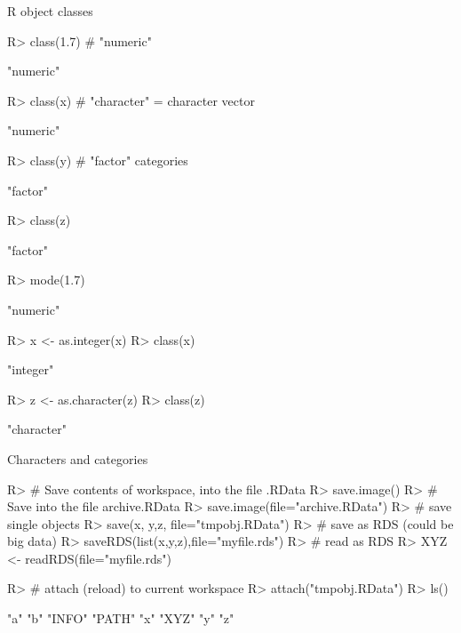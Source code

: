 \documentclass[10pt]{beamer}
\let\proglang=\textsf
\begin{document}
\begin{frame}[fragile]{\proglang{R} object classes}
\begin{Schunk}
\begin{Sinput}
R> class(1.7) # "numeric"
\end{Sinput}
\begin{Soutput}
[1] "numeric"
\end{Soutput}
\begin{Sinput}
R> class(x)   # "character" = character vector
\end{Sinput}
\begin{Soutput}
[1] "numeric"
\end{Soutput}
\begin{Sinput}
R> class(y)   # "factor" categories
\end{Sinput}
\begin{Soutput}
[1] "factor"
\end{Soutput}
\begin{Sinput}
R> class(z)
\end{Sinput}
\begin{Soutput}
[1] "factor"
\end{Soutput}
\begin{Sinput}
R> mode(1.7)
\end{Sinput}
\begin{Soutput}
[1] "numeric"
\end{Soutput}
\begin{Sinput}
R> x <- as.integer(x)
R> class(x)
\end{Sinput}
\begin{Soutput}
[1] "integer"
\end{Soutput}
\begin{Sinput}
R> z <- as.character(z)
R> class(z)
\end{Sinput}
\begin{Soutput}
[1] "character"
\end{Soutput}
\end{Schunk}
\end{frame}
%
\begin{frame}[fragile]{Characters and categories}
\begin{Schunk}
\begin{Sinput}
R> # Save contents of workspace, into the file .RData
R> save.image()
R> # Save into the file archive.RData
R> save.image(file="archive.RData")
R> # save single objects
R> save(x, y,z, file="tmpobj.RData")
R> # save as RDS (could be big data)
R> saveRDS(list(x,y,z),file="myfile.rds")
R> # read as RDS
R> XYZ <- readRDS(file="myfile.rds")
\end{Sinput}
\end{Schunk}
\begin{Schunk}
\begin{Sinput}
R> # attach (reload) to current workspace
R> attach("tmpobj.RData")
R> ls()
\end{Sinput}
\begin{Soutput}
[1] "a"    "b"    "INFO" "PATH" "x"    "XYZ"  "y"    "z"   
\end{Soutput}
\end{Schunk}
\end{frame}
%
\end{document}
